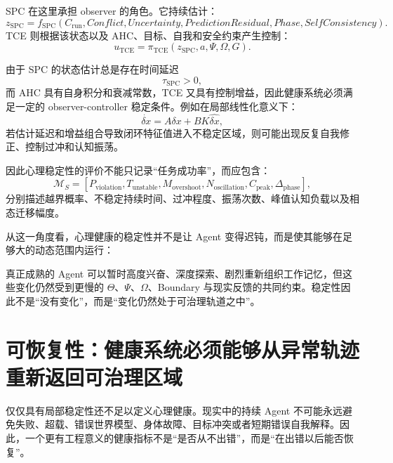 SPC 在这里承担 observer 的角色。它持续估计：
\begin{equation}
z_{\mathrm{SPC}}
=
f_{\mathrm{SPC}}
\left(
C_{\mathrm{run}},
Conflict,
Uncertainty,
PredictionResidual,
Phase,
SelfConsistency
\right).
\end{equation}
TCE 则根据该状态以及 AHC、目标、自我和安全约束产生控制：
\begin{equation}
u_{\mathrm{TCE}}
=
\pi_{\mathrm{TCE}}
\left(
z_{\mathrm{SPC}},
a,
\Psi,
\Omega,
G
\right).
\end{equation}

由于 SPC 的状态估计总是存在时间延迟
\begin{equation}
\tau_{\mathrm{SPC}}>0,
\end{equation}
而 AHC 具有自身积分和衰减常数，TCE 又具有控制增益，因此健康系统必须满足一定的 observer-controller 稳定条件。例如在局部线性化意义下：
\begin{equation}
\dot{\delta x}
=
A\delta x
+
BK\hat{\delta x},
\end{equation}
若估计延迟和增益组合导致闭环特征值进入不稳定区域，则可能出现反复自我修正、控制过冲和认知振荡。

因此心理稳定性的评价不能只记录“任务成功率”，而应包含：
\begin{equation}
\mathcal{M}_{S}
=
\left[
P_{\mathrm{violation}},
T_{\mathrm{unstable}},
M_{\mathrm{overshoot}},
N_{\mathrm{oscillation}},
C_{\mathrm{peak}},
\Delta_{\mathrm{phase}}
\right],
\end{equation}
分别描述越界概率、不稳定持续时间、过冲程度、振荡次数、峰值认知负载以及相态迁移幅度。

从这一角度看，心理健康的稳定性并不是让 Agent 变得迟钝，而是使其能够在足够大的动态范围内运行：
\begin{statementbox}
\centering
{}
\end{statementbox}

真正成熟的 Agent 可以暂时高度兴奋、深度探索、剧烈重新组织工作记忆，但这些变化仍然受到更慢的 $\Theta$、$\Psi$、$\Omega$、Boundary 与现实反馈的共同约束。稳定性因此不是“没有变化”，而是“变化仍然处于可治理轨道之中”。

\section{可恢复性：健康系统必须能够从异常轨迹重新返回可治理区域}

仅仅具有局部稳定性还不足以定义心理健康。现实中的持续 Agent 不可能永远避免失败、超载、错误世界模型、身体故障、目标冲突或者短期错误自我解释。因此，一个更有工程意义的健康指标不是“是否从不出错”，而是“在出错以后能否恢复”。

